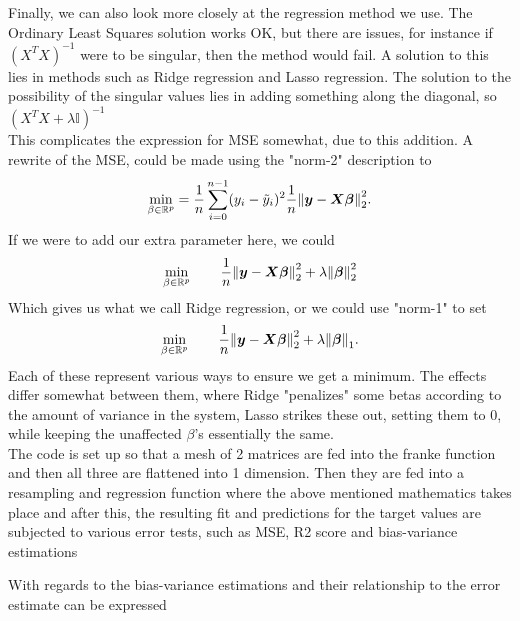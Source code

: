 \documentclass[15pt comic sans]{revtex4-2}
\begin{document}
Finally, we can also look more closely at the regression method we use. The Ordinary 
Least Squares solution works OK, but there are issues, for instance if $(X^TX)^{-1}$
were to be singular, then the method would fail. A solution to this lies in methods
such as Ridge regression and Lasso regression. The solution to the possibility of 
the singular values lies in adding something along the diagonal, so
$(X^TX + \lambda\mathbb{I})^{-1}$\\

This complicates the expression for MSE somewhat, due to this addition. A rewrite of the 
MSE, could be made using the "norm-2" description to
\begin{align}
	\min_{\beta\in\mathbb{R}^p} =
		\frac{1}{n} \sum_{i=0}^{n-1} (y_i - \tilde{y}_i)^2 
		\frac{1}{n} \norm{\bm{y} - \bm{X\beta}}_2^2.
\end{align}
If we were to add our extra parameter here, we could 
\begin{align}
	\min_{\beta\in\mathbb{R}^p}\qq{} \frac{1}{n}\norm{\bm{y} - \bm{X\beta}}_2^2 
		+	\lambda\norm{\bm{\beta}}_2^2
\end{align}
Which gives us what we call Ridge regression, or we could use "norm-1" to set
\begin{align}
	\min_{\beta\in\mathbb{R}^p}\qq{} \frac{1}{n}\norm{\bm{y} - \bm{X\beta}}_2^2 
		+	\lambda\norm{\bm{\beta}}_1.
\end{align}
Each of these represent various ways to ensure we get a minimum. The effects differ 
somewhat between them, where Ridge "penalizes" some betas according to the amount of
variance in the system, Lasso strikes these out, setting them to 0, while keeping the 
unaffected $\beta$'s essentially the same. \\

The code is set up so that a mesh of 2 matrices are fed into the franke function and
then all three are flattened into 1 dimension. Then they are fed into a resampling and
regression function where the above mentioned mathematics takes place and after this, 
the resulting fit and predictions for the target values are subjected to various error
tests, such as MSE, R2 score and bias-variance estimations

With regards to the bias-variance estimations and their relationship to the error 
estimate can be expressed
\end{document}
